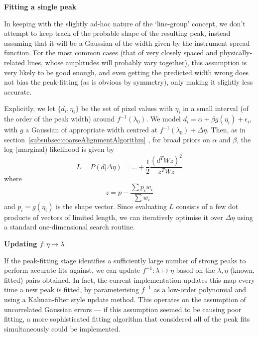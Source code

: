 \vspace{1em}


{\bf{Fitting a single peak}}

\vspace{1em}

In keeping with the slightly ad-hoc nature of the `line-group' concept,
we don't attempt to keep track of the probable shape of the resulting
peak, instead assuming that it will be a Gaussian of the width given
by the instrument spread function. For the most common cases (that of
very closely spaced and physically-related lines, whose amplitudes will
probably vary together), this assumption is very likely to be good
enough, and even getting the predicted width wrong does not bias the
peak-fitting (as is obvious by symmetry), only making it slightly less
accurate.

Explicitly, we let $\{d_i, \eta_i\}$ be the set of pixel values
with $\eta_i$ in a small interval (of the order of the peak
width) around $f^{-1}(\lambda_0)$. We model $d_i = \alpha + \beta
g(\eta_i) + \epsilon_i$, with $g$ a Gaussian of appropriate
width centred at $f^{-1}(\lambda_0) + \Delta\eta$. Then, as in
section~\ref{subsubsec:coarseAlignmentAlgorithm} , for broad priors on
$\alpha$ and $\beta$, the log (marginal) likelihood is given by
\[
L = P(d|\Delta\eta) = \dots + \frac{1}{2} \frac{(d^T W z)^2}{z^T W z}
\]
where
\[
z = p - \frac{\sum p_i w_i}{\sum w_i}
\]
and $p_i = g(\eta_i)$ is the shape vector. Since evaluating $L$ consists
of a few dot products of vectors of limited length, we can iteratively
optimise it over $\Delta\eta$ using a standard one-dimensional search
routine.

\vspace{1em}

{\bf{Updating $f : \eta \mapsto \lambda$}}

\vspace{1em}

If the peak-fitting stage identifies a sufficiently large number of
strong peaks to perform accurate fits against, we can update $f^{-1} : \lambda \mapsto
\eta$ based on the $\lambda, \eta$ (known, fitted) pairs obtained.
In fact, the current implementation updates this map every time a new peak
is fitted, by parameterising $f^{-1}$ as a low-order polynomial and using
a Kalman-filter style update method. This operates on the assumption of
uncorrelated Gaussian errors --- if this assumption seemed to be causing
poor fitting, a more sophisticated fitting algorithm that considered all
of the peak fits simultaneously could be implemented.

